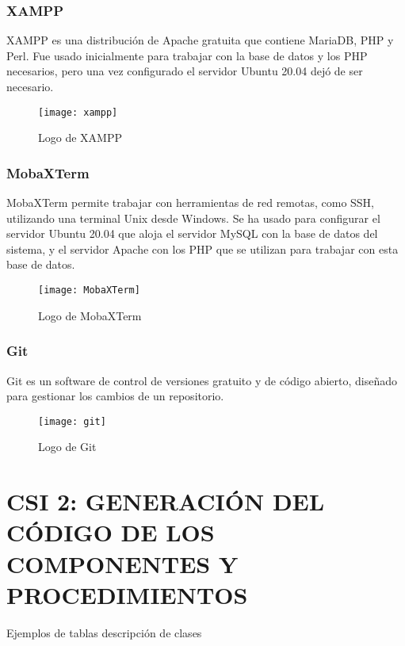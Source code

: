 \subsubsection{XAMPP}
XAMPP es una distribución de Apache gratuita que contiene MariaDB, PHP y Perl\cite{Xampp}. Fue usado inicialmente para trabajar con la base de datos y los PHP necesarios, pero una vez configurado el servidor Ubuntu 20.04 dejó de ser necesario.
\begin{figure}[H]
	\centering
	\texttt{[image: xampp]}
	\caption{Logo de XAMPP}
\end{figure}
\subsubsection{MobaXTerm}
MobaXTerm permite trabajar con herramientas de red remotas, como SSH, utilizando una terminal Unix desde Windows. Se ha usado para configurar el servidor Ubuntu 20.04 que aloja el servidor MySQL con la base de datos del sistema, y el servidor Apache con los PHP que se utilizan para trabajar con esta base de datos.
\begin{figure}[H]
	\centering
	\texttt{[image: MobaXTerm]}
	\caption{Logo de MobaXTerm}
\end{figure}

\subsubsection{Git}
Git es un software de control de versiones gratuito y de código abierto, diseñado para gestionar los cambios de un repositorio\cite{Git}.
\begin{figure}[H]
	\centering
	\texttt{[image: git]}
	\caption{Logo de Git}
\end{figure}

\newpage
\section[CSI 2: GENERACIÓN DEL CÓDIGO DE LOS COMPONENTES Y \\ PROCEDIMIENTOS]{CSI 2: GENERACIÓN DEL CÓDIGO DE LOS COMPONENTES Y PROCEDIMIENTOS}

\textcolor[rgb]{0.65,0.16,0}{Ejemplos de tablas descripción de clases}

